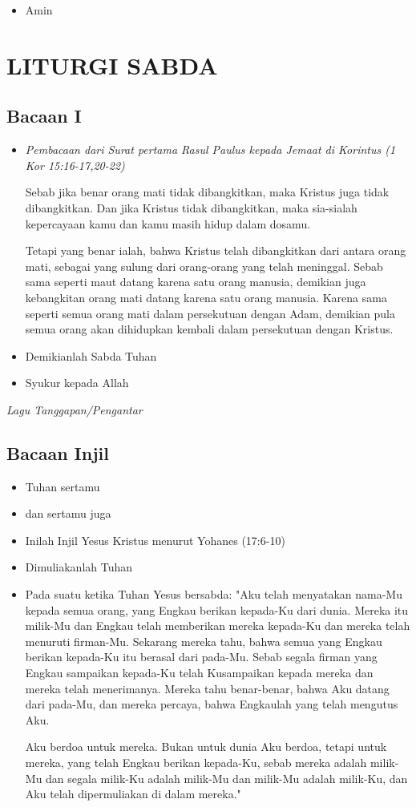 \documentclass[a5paper,headsepline,titlepage,12pt,nnormalheadings,DIVcalc,twoside]{scrbook}
\makeatletter
\newcommand{\lagu}[1]{%
  {\parindent \z@ 
    \interlinepenalty\@M \slshape \mdseries \large \textit{#1}\par\nobreak \vskip 10\p@ }}
\newcommand{\BU}[1]{\begin{itemize} \item[U:] #1 \end{itemize}}
\newcommand{\BI}[1]{\begin{itemize} \item[I:] #1 \end{itemize}}
\newcommand{\BP}[1]{\begin{itemize} \item[P:] #1 \end{itemize}}
\makeatother
\begin{document}
\BU{Amin}

\section*{LITURGI SABDA}

\subsection*{Bacaan I}

\BP{\emph{Pembacaan dari Surat pertama Rasul Paulus kepada Jemaat di Korintus (1 Kor 15:16-17,20-22)}

Sebab jika benar orang mati tidak dibangkitkan, maka Kristus juga tidak dibangkitkan.
Dan jika Kristus tidak dibangkitkan, maka sia-sialah kepercayaan kamu dan kamu masih hidup dalam dosamu.

Tetapi yang benar ialah, bahwa Kristus telah dibangkitkan dari antara orang mati, sebagai yang sulung dari orang-orang yang telah meninggal.
Sebab sama seperti maut datang karena satu orang manusia, demikian juga kebangkitan orang mati datang karena satu orang manusia.
Karena sama seperti semua orang mati dalam persekutuan dengan Adam, demikian pula semua orang akan dihidupkan kembali dalam persekutuan dengan Kristus.

}

\BP{Demikianlah Sabda Tuhan}

\BU{Syukur kepada Allah}

\lagu{Lagu Tanggapan/Pengantar}

\subsection*{Bacaan Injil}

\BI{Tuhan sertamu}
\BU{dan sertamu juga}
\BI{Inilah Injil Yesus Kristus menurut Yohanes (17:6-10)}
\BU{Dimuliakanlah Tuhan}

\BI{
Pada suatu ketika Tuhan Yesus bersabda: "Aku telah menyatakan nama-Mu kepada semua orang, yang Engkau berikan kepada-Ku dari dunia. Mereka itu milik-Mu dan Engkau telah memberikan mereka kepada-Ku dan mereka telah menuruti firman-Mu.
Sekarang mereka tahu, bahwa semua yang Engkau berikan kepada-Ku itu berasal dari pada-Mu.
Sebab segala firman yang Engkau sampaikan kepada-Ku telah Kusampaikan kepada mereka dan mereka telah menerimanya. Mereka tahu benar-benar, bahwa Aku datang dari pada-Mu, dan mereka percaya, bahwa Engkaulah yang telah mengutus Aku.

Aku berdoa untuk mereka. Bukan untuk dunia Aku berdoa, tetapi untuk mereka, yang telah Engkau berikan kepada-Ku, sebab mereka adalah milik-Mu
dan segala milik-Ku adalah milik-Mu dan milik-Mu adalah milik-Ku, dan Aku telah dipermuliakan di dalam mereka."
}
\end{document}
